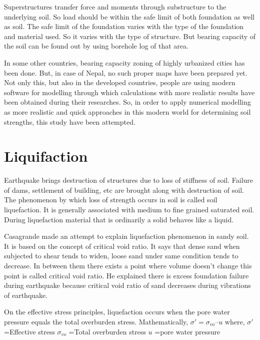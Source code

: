 Superstructures transfer force and moments through substructure to the underlying soil. So load should be within the safe limit of both foundation as well as soil. The safe limit of the foundation varies with the type of the foundation and material used. So it varies with the type of structure. But bearing capacity of the soil can be found out by using borehole log of that area.

In some other countries, bearing capacity zoning of highly urbanized cities has been done. But, in case of  Nepal,  no  such  proper  maps  have  been  prepared  yet.  Not  only  this,  but  also  in  the  developed countries,  people  are    using    modern software for modelling through  which  calculations  with  more realistic results have been obtained during their researches. So, in order to apply numerical modelling as more realistic and quick approaches in this modern world for determining soil strengths, this study have been attempted.

\section{Liquifaction}
Earthquake brings destruction of structures due to loss of stiffness of soil. Failure of dams, settlement of building, etc are brought along with destruction of soil. The phenomenon by which loss of strength occurs in soil is called soil liquefaction. It is generally associated with medium to fine grained saturated soil. During liquefaction material that is ordinarily a solid behaves like a liquid.

Casagrande\cite{arthur_characteristics_1936} made an attempt to explain liquefaction phenomenon in sandy soil. It is based on the concept of critical void ratio. It says that dense sand when subjected to shear tends to widen, loose sand under same condition tends to decrease. In between them there exists a point where volume doesn’t change this point is called critical void ratio. He explained there is excess foundation failure during earthquake because critical void ratio of sand decreases during vibrations of earthquake.

On the effective stress principles, liquefaction occurs when the pore water pressure  equals the total overburden stress. Mathematically,
	$\sigma'  =  \sigma_{vo} – u$
where,
	$\sigma'$=Effective stress
	$\sigma_{vo}$ =Total overburden stress
	$u$ =pore water pressure

